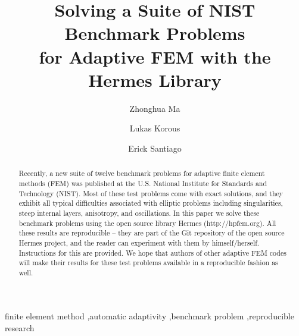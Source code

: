 \documentclass[12pt]{elsarticle}
\begin{document}
\begin{frontmatter}



\title{Solving a Suite of NIST Benchmark Problems\\ for Adaptive FEM with the Hermes Library}

\author[label1]{Zhonghua Ma}
\author[label2]{Lukas Korous}
\author[label3]{Erick Santiago}
\address[label1]{China University of Petroleum, Beijing, China}
\address[label2]{Charles University, Prague, Czech Republic}
\address[label3]{University of Nevada, Reno, USA}

\begin{abstract}
Recently, a new suite of twelve benchmark problems for adaptive finite element methods (FEM)
was published at the U.S. National Institute for Standards and Technology (NIST).
Most of these test problems come with exact solutions, and they exhibit all typical difficulties
associated with elliptic problems including singularities, steep internal layers, anisotropy,
and oscillations. In this paper we solve these benchmark problems using the open source
library Hermes (http://hpfem.org). All these results are reproducible -- they are part of
the Git repository of the open source Hermes project, and the reader can experiment
with them by himself/herself. Instructions for this are provided. We hope that authors
of other adaptive FEM codes will make their results for these test problems available
in a reproducible fashion as well.
\end{abstract}

\begin{keyword}
finite element method \sep automatic adaptivity \sep benchmark problem \sep reproducible research
\end{keyword}

\end{frontmatter}
\end{document}

